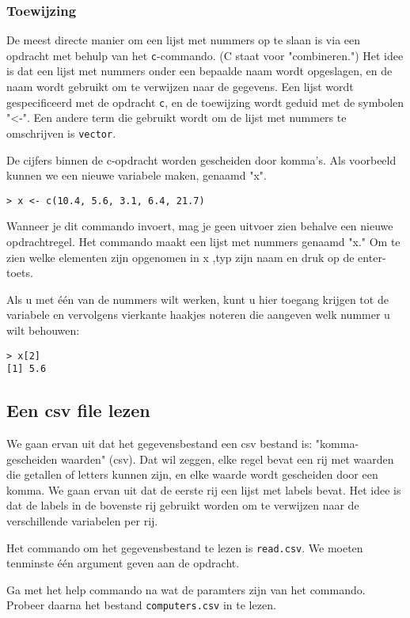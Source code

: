 \subsubsection{Toewijzing}
De meest directe manier om een lijst met nummers op te slaan is via een opdracht met behulp van het \texttt{c}-commando. (C staat voor "combineren.") Het idee is dat een lijst met nummers onder een bepaalde naam wordt opgeslagen, en de naam wordt gebruikt om te verwijzen naar de gegevens. Een lijst wordt gespecificeerd met de opdracht \texttt{c}, en de toewijzing wordt geduid met de symbolen "<-". Een andere term die gebruikt wordt om de lijst met nummers te omschrijven is \texttt{vector}.

De cijfers binnen de c-opdracht worden gescheiden door komma's. Als voorbeeld kunnen we een nieuwe variabele maken, genaamd "x".

\begin{lstlisting}
> x <- c(10.4, 5.6, 3.1, 6.4, 21.7)
\end{lstlisting}
Wanneer je dit commando invoert, mag je geen uitvoer zien behalve een nieuwe opdrachtregel. Het commando maakt een lijst met nummers genaamd "x." Om te zien welke elementen zijn opgenomen in x ,typ zijn naam en druk op de enter-toets.

Als u met één van de nummers wilt werken, kunt u hier toegang krijgen tot de variabele en vervolgens vierkante haakjes noteren die aangeven welk nummer u wilt behouwen:

\begin{lstlisting}
> x[2]
[1] 5.6
\end{lstlisting}

\subsection{Een csv file lezen}
We gaan ervan uit dat het gegevensbestand een csv bestand is: "komma-gescheiden waarden" (csv). Dat wil zeggen, elke regel bevat een rij met waarden die getallen of letters kunnen zijn, en elke waarde wordt gescheiden door een komma. We gaan ervan uit dat de eerste rij een lijst met labels bevat. Het idee is dat de labels in de bovenste rij gebruikt worden om te verwijzen naar de verschillende variabelen per rij.

Het commando om het gegevensbestand te lezen is \texttt{read.csv}. We moeten tenminste één argument geven aan de opdracht.

\begin{exercise}
	Ga met het help commando na wat de paramters zijn van het commando. Probeer daarna het bestand \texttt{computers.csv} in te lezen. 
\end{exercise}

